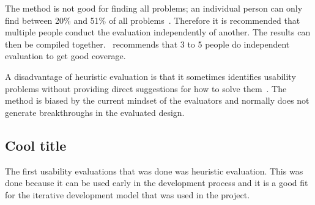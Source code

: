 The method is not good for finding all problems; an individual person can only find between 20\% and 51\% of all problems~\cite{Nielsen1990}. Therefore it is recommended that multiple people conduct the evaluation independently of another. The results can then be compiled together.~\cite{Nielsen1990} recommends that 3 to 5 people do independent evaluation to get good coverage.

A disadvantage of heuristic evaluation is that it sometimes identifies usability problems without providing direct suggestions for how to solve them~\cite{Nielsen1990}. The method is biased by the current mindset of the evaluators and normally does not generate breakthroughs in the evaluated design.

\subsection{Cool title}
The first usability evaluations that was done was heuristic evaluation. This was done because it can be used early in the development process and it is a good fit for the iterative development model that was used in the project.

